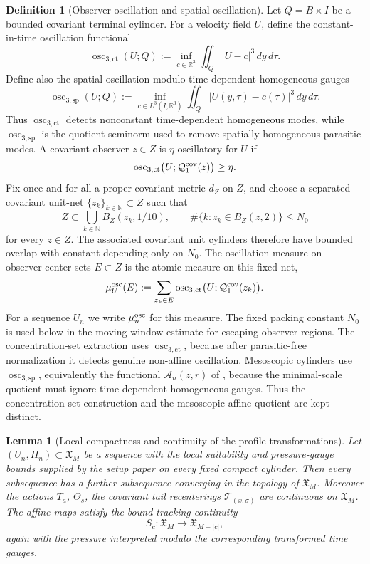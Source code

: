 \documentclass[11pt]{amsart}
\numberwithin{equation}{section}
\theoremstyle{plain}
\newtheorem{lemma}[lemma]{Lemma}
\theoremstyle{definition}
\newtheorem{definition}[definition]{Definition}
\theoremstyle{remark}
\newcommand{\oscsp}{\operatorname{osc}_{3,\mathrm{sp}}}
\newcommand{\actthree}{\operatorname{osc}_{3,\mathrm{ct}}}
\begin{document}
\begin{definition}[Observer oscillation and spatial oscillation]
\label{def:observer-oscillation}
Let \(Q=B\times I\) be a bounded covariant terminal cylinder.  For a velocity
field \(U\), define the constant-in-time oscillation functional
\[
   \actthree(U;Q)
   :=
   \inf_{c\in\mathbb R^3}\iint_Q |U-c|^3\,dy\,d\tau .
\]
Define also the spatial oscillation modulo time-dependent homogeneous gauges
\[
   \oscsp(U;Q)
   :=
   \inf_{c\in L^3(I;\mathbb R^3)}
      \iint_Q |U(y,\tau)-c(\tau)|^3\,dy\,d\tau .
\]
Thus \(\actthree\) detects nonconstant time-dependent homogeneous modes, while
\(\oscsp\) is the quotient seminorm used to remove spatially homogeneous
parasitic modes.
A covariant observer \(z\in Z\) is \(\eta\)-oscillatory for \(U\) if
\[
   \actthree\bigl(U;\mathcal Q_1^{\rm cov}(z)\bigr)\ge\eta .
\]
Fix once and for all a proper covariant metric \(d_Z\) on \(Z\), and choose a
separated covariant unit-net \(\{z_k\}_{k\in\mathbb N}\subset Z\) such that
\[
   Z\subset \bigcup_{k\in\mathbb N} B_Z(z_k,1/10),
   \qquad
   \#\{k:z_k\in B_Z(z,2)\}\le N_0
\]
for every \(z\in Z\).  The associated covariant unit cylinders therefore have
bounded overlap with constant depending only on \(N_0\).  The oscillation
measure on observer-center sets \(E\subset Z\) is the atomic measure on this
fixed net,
\[
   \mu_U^{\rm osc}(E)
   :=
   \sum_{z_k\in E}
      \actthree\bigl(U;\mathcal Q_1^{\rm cov}(z_k)\bigr) .
\]
For a sequence \(U_n\) we write \(\mu_n^{\rm osc}\) for this measure.  The
fixed packing constant \(N_0\) is used below in the moving-window estimate for
escaping observer regions.  The concentration-set extraction uses \(\actthree\),
because after parasitic-free normalization it detects genuine non-affine
oscillation.  Mesoscopic cylinders use \(\oscsp\), equivalently the functional
\(\mathcal A_n(z,r)\) of
, because the minimal-scale quotient
must ignore time-dependent homogeneous gauges.  Thus the concentration-set
construction and the mesoscopic affine quotient are kept distinct.
\end{definition}

\begin{lemma}[Local compactness and continuity of the profile transformations]
\label{lem:state-space-local-compactness}
Let \((U_n,\Pi_n)\subset\mathfrak X_M\) be a sequence with the local suitability
and pressure-gauge bounds supplied by the setup paper on every fixed compact
cylinder.
Then every subsequence has a further subsequence converging in the topology of
\(\mathfrak X_M\).  Moreover the actions \(T_a\), \(\Theta_s\), the covariant
tail recenterings \(\mathscr T_{(x,\sigma)}\) are continuous on
\(\mathfrak X_M\).  The affine maps satisfy the bound-tracking continuity
\[
   S_c:\mathfrak X_M\longrightarrow \mathfrak X_{M+|c|},
\]
again with the pressure interpreted modulo the corresponding transformed time
gauges.
\end{lemma}
\end{document}
